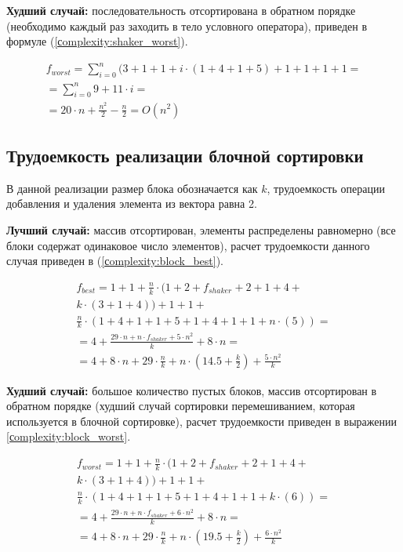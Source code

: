 \textbf{Худший случай:} последовательность отсортирована в обратном порядке (необходимо каждый раз заходить в тело условного оператора), приведен в формуле (\ref{сomplexity:shaker_worst}).

\begin{equation}
	\label{сomplexity:shaker_worst}
	\begin{gathered}
		f_{worst} = \sum_{i=0}^{n}  (3 +  1 + 1 + i \cdot (1 +4  + 1 + 5) + 1 +1 +1 +1 = \\ = \sum_{i=0}^{n} 9 + 11 \cdot i = \\
		= 20 \cdot n + \frac{n^2}{2} - \frac{n}{2} = O(n^2)
	\end{gathered}
\end{equation}

\subsection{Трудоемкость реализации блочной сортировки}
В данной реализации размер блока обозначается как $k$, трудоемкость операции добавления и удаления элемента из вектора равна 2.


\textbf{Лучший случай:} массив отсортирован, элементы распределены равномерно (все блоки содержат одинаковое число элементов), расчет трудоемкости данного случая приведен в (\ref{сomplexity:block_best}).


\begin{equation}
	\label{сomplexity:block_best}
	\begin{gathered}
		f_{best} = 1 +1 + \frac{n}{k} \cdot(1 + 2+f_{shaker} + 2 + 1 + 4 + \\
		k \cdot (3 + 1 + 4)) + 1 + 1 + \\
		\frac{n}{k} \cdot (1 + 4 + 1 + 1 + 5 + 1 + 4 + 1 + 1 + n \cdot (5)) = \\
		= 4 + \frac{29\cdot n + n \cdot f_{shaker} + 5 \cdot n^2}{k}  + 8 \cdot n  = \\
		= 4 + 8 \cdot n + 29 \cdot \frac{n}{k} + n \cdot (14.5 + \frac{k}{2}) + \frac{5 \cdot n^2}{k} 
	\end{gathered}
\end{equation}




\textbf{Худший случай:} большое количество пустых блоков, массив отсортирован в обратном порядке (худший случай сортировки перемешиванием, которая используется в блочной сортировке), расчет трудоемкости приведен в выражении \ref{сomplexity:block_worst}.

\begin{equation}
	\label{сomplexity:block_worst}
	\begin{gathered}
		f_{worst} = 1 +1 + \frac{n}{k} \cdot(1 + 2+f_{shaker} + 2 + 1 + 4 + \\
		k \cdot (3 + 1 + 4)) + 1 + 1 + \\
		\frac{n}{k} \cdot (1 + 4 + 1 + 1 + 5 + 1 + 4 + 1 + 1 + k \cdot (6)) = \\
		= 4 + \frac{29\cdot n + n \cdot f_{shaker} + 6 \cdot n^2}{k}  + 8 \cdot n  = \\
		= 4 + 8 \cdot n + 29 \cdot \frac{n}{k} + n \cdot (19.5 + \frac{k}{2}) + \frac{6 \cdot n^2}{k} 
	\end{gathered}
\end{equation}

